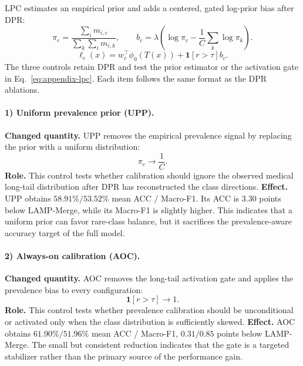 \documentclass[letterpaper]{article}
\theoremstyle{definition}
\theoremstyle{plain}
\begin{document}
LPC estimates an empirical prior and adds a centered, gated log-prior bias after DPR:
\begin{equation}
\pi_c=\frac{\sum_i m_{i,c}}{\sum_k\sum_i m_{i,k}},\qquad
b_c=\lambda\left(\log\pi_c-\frac{1}{C}\sum_k\log\pi_k\right).
\label{eq:appendix-lpc}
\end{equation}
\begin{equation}
\ell_c(x)=w_c^\top\phi_0(T(x))+\mathbf{1}[r>\tau]b_c.
\end{equation}
The three controls retain DPR and test the prior estimator or the activation gate in Eq.~\ref{eq:appendix-lpc}. Each item follows the same format as the DPR ablations.

\paragraph{1) Uniform prevalence prior (UPP).}
\textbf{Changed quantity.} UPP removes the empirical prevalence signal by replacing the prior with a uniform distribution:
\begin{equation}
\pi_c\longrightarrow\frac{1}{C}.
\end{equation}
\textbf{Role.} This control tests whether calibration should ignore the observed medical long-tail distribution after DPR has reconstructed the class directions. \textbf{Effect.} UPP obtains \(58.91\% / 53.52\%\) mean ACC / Macro-F1. Its ACC is \(3.30\) points below LAMP-Merge, while its Macro-F1 is slightly higher. This indicates that a uniform prior can favor rare-class balance, but it sacrifices the prevalence-aware accuracy target of the full model.

\paragraph{2) Always-on calibration (AOC).}
\textbf{Changed quantity.} AOC removes the long-tail activation gate and applies the prevalence bias to every configuration:
\begin{equation}
\mathbf{1}[r>\tau]\longrightarrow1.
\end{equation}
\textbf{Role.} This control tests whether prevalence calibration should be unconditional or activated only when the class distribution is sufficiently skewed. \textbf{Effect.} AOC obtains \(61.90\% / 51.96\%\) mean ACC / Macro-F1, \(0.31 / 0.85\) points below LAMP-Merge. The small but consistent reduction indicates that the gate is a targeted stabilizer rather than the primary source of the performance gain.
\end{document}
